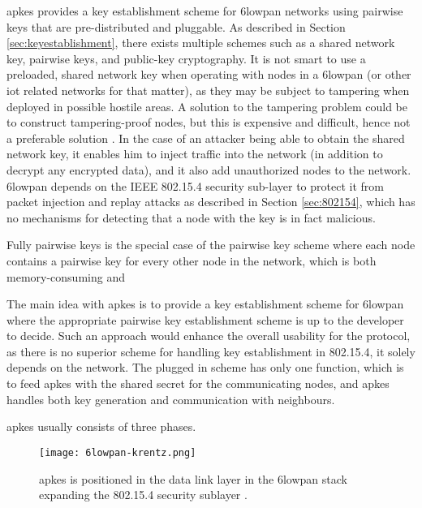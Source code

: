 \gls{apkes} provides a key establishment scheme for \gls{6lowpan} networks using pairwise keys that are pre-distributed and pluggable. As described in Section \ref{sec:keyestablishment}, there exists multiple schemes such as a shared network key, pairwise keys, and public-key cryptography. It is not smart to use a preloaded, shared network key when operating with nodes in a \gls{6lowpan} (or other \gls{iot} related networks for that matter), as they may be subject to tampering when deployed in possible hostile areas. A solution to the tampering problem could be to construct tampering-proof nodes, but this is expensive and difficult, hence not a preferable solution \cite{anderson1996tamper}. In the case of an attacker being able to obtain the shared network key, it enables him to inject traffic into the network (in addition to decrypt any encrypted data), and it also add unauthorized nodes to the network.  \gls{6lowpan} depends on the IEEE 802.15.4 security sub-layer to protect it from packet injection and replay attacks as described in Section \ref{sec:802154}, which has no mechanisms for detecting that a node with the key is in fact malicious.


Fully pairwise keys is the special case of the pairwise key scheme where each node contains a pairwise key for every other node in the network, which is both memory-consuming and 

The main idea with \gls{apkes} is to provide a key establishment scheme for \gls{6lowpan} where the appropriate pairwise key establishment scheme is up to the developer to decide. Such an approach would enhance the overall usability for the protocol, as there is no superior scheme for handling key establishment in 802.15.4, it solely depends on the network. The plugged in scheme has only one function, which is to feed \gls{apkes} with the shared secret for the communicating nodes, and \gls{apkes} handles both key generation and communication with neighbours. 

\gls{apkes} usually consists of three phases.




\begin{figure}[h]
	\centering
	\texttt{[image: 6lowpan-krentz.png]}
	\caption{\gls{apkes} is positioned in the data link layer in the \gls{6lowpan} stack expanding the 802.15.4 security sublayer \cite{krentz20136lowpan}.}
	\label{fig:6lowpan-krentz}
\end{figure}



